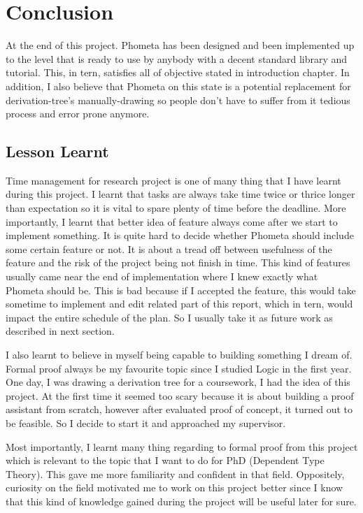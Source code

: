 \documentclass[master.tex]{subfiles}
\begin{document}
\chapter{Conclusion}

At the end of this project. Phometa has been designed and been implemented up to
the level that is ready to use by anybody with a decent standard library and
tutorial. This, in tern, satisfies all of objective stated in introduction
chapter. In addition, I also believe that Phometa on this state is a potential
replacement for derivation-tree's manually-drawing so people don't have to
suffer from it tedious process and error prone anymore.

\section{Lesson Learnt}

Time management for research project is one of many thing that I have learnt
during this project. I learnt that tasks are always take time twice or thrice
longer than expectation so it is vital to spare plenty of time before the
deadline. More importantly, I learnt that better idea of feature always come
after we start to implement something. It is quite hard to decide whether
Phometa should include some certain feature or not. It is about a tread off
between usefulness of the feature and the risk of the project being not finish
in time. This kind of features usually came near the end of implementation where
I knew exactly what Phometa should be. This is bad because if I accepted the
feature, this would take sometime to implement and edit related part of this
report, which in tern, would impact the entire schedule of the plan. So I
usually take it as future work as described in next section.

I also learnt to believe in myself being capable to building something I dream
of. Formal proof always be my favourite topic since I studied Logic in the first
year. One day, I was drawing a derivation tree for a coursework, I had the idea
of this project. At the first time it seemed too scary because it is about
building a proof assistant from scratch, however after evaluated proof of
concept, it turned out to be feasible. So I decide to start it and approached my
supervisor.

Most importantly, I learnt many thing regarding to formal proof from this
project which is relevant to the topic that I want to do for PhD (Dependent Type
Theory). This gave me more familiarity and confident in that field. Oppositely,
curiosity on the field motivated me to work on this project better since I know
that this kind of knowledge gained during the project will be useful later for
sure.
\end{document}
